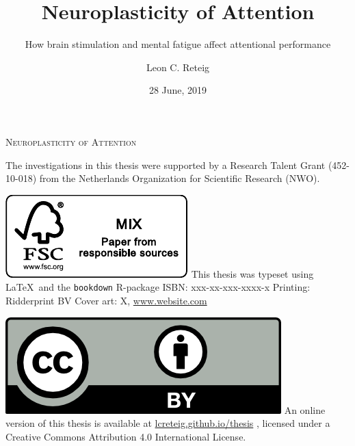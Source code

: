 \documentclass[12pt,a4paper,]{memoir}
\title{Neuroplasticity of Attention}
\subtitle{How brain stimulation and mental fatigue affect attentional performance}
\author{Leon C. Reteig}
\date{28 June, 2019}
\begin{document}
\maketitle

\frontmatter
\pagestyle{empty} 

\def\drop{.1\textheight}
\vspace*{\drop}
\begin{center}
\Huge \textsc{Neuroplasticity of Attention} %
\end{center}

\clearpage
\vspace*{\fill}
\begingroup %
\small
\setlength{\parskip}{\baselineskip} %
\setlength\parindent{0pt} %
The investigations in this thesis were supported by 
a Research Talent Grant (452-10-018)  %
from 
the Netherlands Organization for Scientific Research (NWO). %

\includegraphics{_bookdown_files/FSC.pdf} \newline
This thesis was typeset using \LaTeX\ and the \verb+bookdown+ R-package \newline
ISBN: xxx-xx-xxx-xxxx-x \newline %
Printing: Ridderprint BV \newline %
Cover art: X, \url{www.website.com} %

\includegraphics{_bookdown_files/CC-BY.png} \newline
An online version of this thesis is available at 
\url{lcreteig.github.io/thesis} %
, licensed under a 
Creative Commons Attribution 4.0 International License. %
\endgroup
\end{document}
